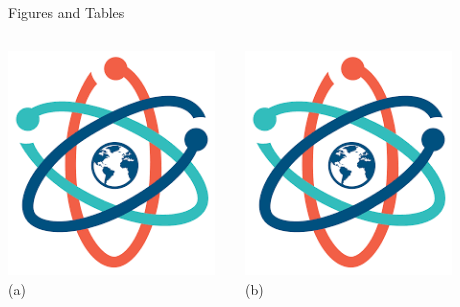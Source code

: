 \documentclass[12pt,aspect=169]{beamer}
\begin{document}
\begin{frame}{Figures and Tables}

\centering\tiny
\begin{columns}[T]

\includegraphics[width=0.96\textwidth]{science} \\(a)

\includegraphics[width=0.96\textwidth]{science} \\(b)


\end{columns}
\end{frame}
\end{document}
